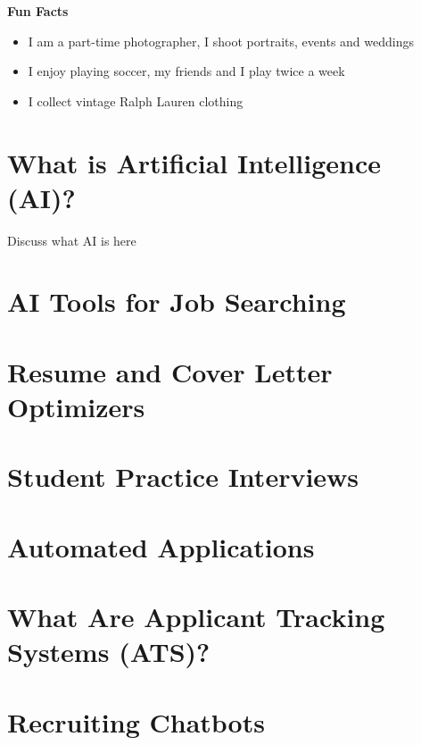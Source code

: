 \documentclass[
]{book}
\begin{document}
\textbf{Fun Facts}

\begin{itemize}
\item
  I am a part-time photographer, I shoot portraits, events and weddings
\item
  I enjoy playing soccer, my friends and I play twice a week
\item
  I collect vintage Ralph Lauren clothing
\end{itemize}

\hypertarget{what-is-artificial-intelligence-ai}{%
\chapter{What is Artificial Intelligence (AI)?}\label{what-is-artificial-intelligence-ai}}

Discuss what AI is here

\hypertarget{ai-tools-for-job-searching}{%
\chapter{AI Tools for Job Searching}\label{ai-tools-for-job-searching}}

\hypertarget{resume-and-cover-letter-optimizers}{%
\chapter{Resume and Cover Letter Optimizers}\label{resume-and-cover-letter-optimizers}}

\hypertarget{student-practice-interviews}{%
\chapter{Student Practice Interviews}\label{student-practice-interviews}}

\hypertarget{automated-applications}{%
\chapter{Automated Applications}\label{automated-applications}}

\hypertarget{what-are-applicant-tracking-systems-ats}{%
\chapter{What Are Applicant Tracking Systems (ATS)?}\label{what-are-applicant-tracking-systems-ats}}

\hypertarget{recruiting-chatbots}{%
\chapter{Recruiting Chatbots}\label{recruiting-chatbots}}
\end{document}
